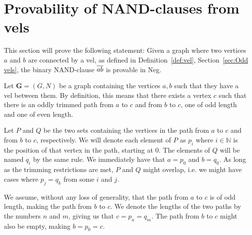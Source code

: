 
\section{Provability of NAND-clauses from vels}
\label{sec:Provability of NAND-clauses from vels}
This section will prove the following statement:
Given a graph where two vertices $a$ and $b$ are connected by a vel, as defined in Definition~\ref{def:vel}, Section~\ref{sec:Odd vels}, the binary NAND-clause $\ol{ab}$ is provable in Neg.

Let $\mathbf{G} = (G,N)$ be a graph containing the vertices $a,b$ such that they have a vel between them.
By definition, this means that there exists a vertex $c$ such that there is an oddly trimmed path from $a$ to $c$ and from $b$ to $c$, one of odd length and one of even length.

Let $P$ and $Q$ be the two sets containing the vertices in the path from $a$ to $c$ and from $b$ to $c$, respectively.
We will denote each element of $P$ as $p_i$ where $i \in \mathbb{N}$ is the position of that vertex in the path, starting at 0.
The elements of $Q$ will be named $q_i$ by the same rule.
We immediately have that $a = p_0$ and $b = q_0$.
As long as the trimming restrictions are met, $P$ and $Q$ might overlap, i.e. we might have cases where $p_j = q_k$ from some $i$ and $j$.

We assume, without any loss of generality, that the path from $a$ to $c$ is of odd length, making the path from $b$ to $c$.
We denote the lengths of the two paths by the numbers $n$ and $m$, giving us that $c = p_n = q_m$.
The path from $b$ to $c$ might also be empty, making $b = p_0 = c$.

